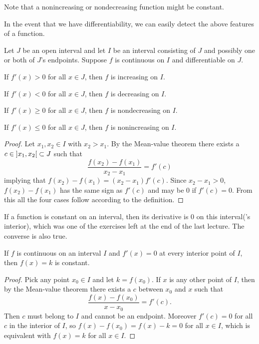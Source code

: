 \begin{remark}
	Note that a nonincreasing or nondecreasing function might be constant.
\end{remark}

\noindent
In the event that we have differentiability, we can easily detect the above features of a function.

\begin{theorem}\label{lec4:monotonicityproof}
	Let $J$ be an open interval and let $I$ be an interval consisting of $J$ and possibly one or both of $J$'s endpoints.
	Suppose $f$ is continuous on $I$ and differentiable on $J$.
	\begin{romanlist}
		\item If $f'(x) > 0$ for all $x \in J$, then $f$ is increasing on $I$.
		\item If $f'(x) < 0$ for all $x \in J$, then $f$ is decreasing on $I$.
		\item If $f'(x) \geq 0$ for all $x \in J$, then $f$ is nondecreasing on $I$.
		\item If $f'(x) \leq 0$ for all $x \in J$, then $f$ is nonincreasing on $I$.
	\end{romanlist}
\end{theorem}

\begin{proof}
	Let $x_1, x_2 \in I$ with $x_2 > x_1$.
	By the Mean-value theorem there exists a $c \in \interval[open]{x_1}{x_2} \subset J$ such that
	\[
		\frac{f(x_2) - f(x_1)}{x_2 - x_1} = f'(c)
	\]
	implying that $f(x_2) - f(x_1) = (x_2 - x_1) f'(c)$.
	Since $x_2 - x_1 > 0$, $f(x_2) - f(x_1)$ has the same sign as $f'(c)$ and may be $0$ if $f'(c) = 0$.
	From this all the four cases follow according to the definition.
\end{proof}

\noindent
If a function is constant on an interval, then its derivative is $0$ on this interval('s interior), which was one of the exercises left at the end of the last lecture.
The converse is also true.

\begin{theorem}\label{lec4:constantfunction}
	If $f$ is continuous on an interval $I$ and $f'(x) = 0$ at every interior point of $I$, then $f(x) = k$ is constant.
\end{theorem}

\begin{proof}
	Pick any point $x_0 \in I$ and let $k = f(x_0)$.
	If $x$ is any other point of $I$, then by the Mean-value theorem there exists a $c$ between $x_0$ and $x$ such that
	\[
		\frac{f(x) - f(x_0)}{x - x_0} = f'(c).
	\]
	Then $c$ must belong to $I$ and cannot be an endpoint.
	Moreover $f'(c) = 0$ for all $c$ in the interior of $I$, so $f(x) - f(x_0) = f(x) - k = 0$ for all $x \in I$, which is equivalent with $f(x) = k$ for all $x \in I$.
\end{proof}

